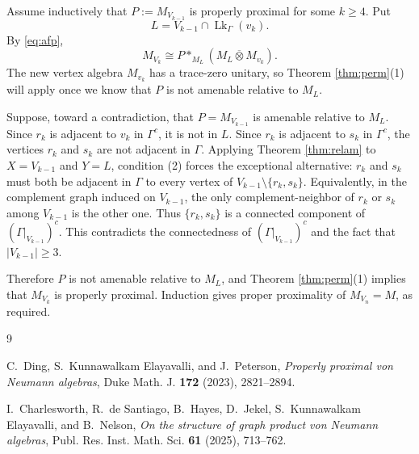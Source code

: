\documentclass[12pt]{article}
\DeclareMathOperator{\Lk}{Lk}
\newcommand{\bbarotimes}{\mathbin{\overline{\otimes}}}
\begin{document}
Assume inductively that $P:=M_{V_{k-1}}$ is properly proximal for some
$k\ge4$.  Put
\[
        L=V_{k-1}\cap \Lk_\Gamma(v_k).
\]
By \eqref{eq:afp},
\[
        M_{V_k}\cong P*_{M_L}(M_L\bbarotimes M_{v_k}).
\]
The new vertex algebra $M_{v_k}$ has a trace-zero unitary, so Theorem
\ref{thm:perm}(1) will apply once we know that $P$ is not amenable relative to
$M_L$.

Suppose, toward a contradiction, that $P=M_{V_{k-1}}$ is amenable relative to
$M_L$.  Since $r_k$ is adjacent to $v_k$ in $\Gamma^c$, it is not in $L$.
Since $r_k$ is adjacent to $s_k$ in $\Gamma^c$, the vertices $r_k$ and $s_k$
are not adjacent in $\Gamma$.  Applying Theorem \ref{thm:relam} to
$X=V_{k-1}$ and $Y=L$, condition (2) forces the exceptional alternative:
$r_k$ and $s_k$ must both be adjacent in $\Gamma$ to every vertex of
$V_{k-1}\setminus\{r_k,s_k\}$.  Equivalently, in the complement graph induced
on $V_{k-1}$, the only complement-neighbor of $r_k$ or $s_k$ among
$V_{k-1}$ is the other one.  Thus $\{r_k,s_k\}$ is a connected component of
$(\Gamma|_{V_{k-1}})^c$.  This contradicts the connectedness of
$(\Gamma|_{V_{k-1}})^c$ and the fact that $|V_{k-1}|\ge3$.

Therefore $P$ is not amenable relative to $M_L$, and Theorem
\ref{thm:perm}(1) implies that $M_{V_k}$ is properly proximal.  Induction gives
proper proximality of $M_{V_n}=M$, as required.

\begin{thebibliography}{9}

C.~Ding, S.~Kunnawalkam Elayavalli, and J.~Peterson,
\emph{Properly proximal von Neumann algebras},
Duke Math. J. \textbf{172} (2023), 2821--2894.

I.~Charlesworth, R.~de Santiago, B.~Hayes, D.~Jekel,
S.~Kunnawalkam Elayavalli, and B.~Nelson,
\emph{On the structure of graph product von Neumann algebras},
Publ. Res. Inst. Math. Sci. \textbf{61} (2025), 713--762.

\end{thebibliography}
\end{document}
